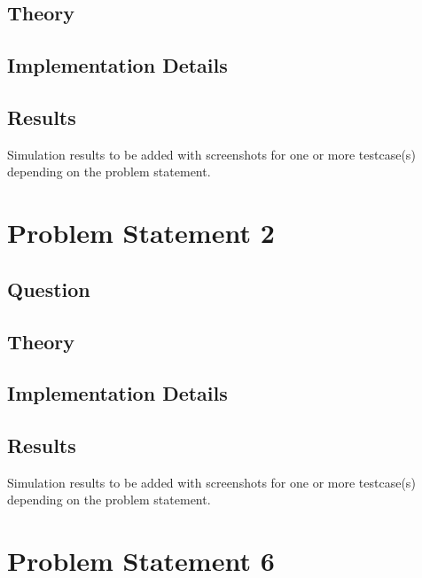 \documentclass[11pt,a4paper]{article}
\begin{document}
\subsection{Theory}\label{sec:theory1}

\subsection{Implementation Details}\label{sec:details1}

\subsection{Results}\label{sec:results1}
Simulation results to be added with screenshots for one or more testcase(s) depending on the problem statement.


\section{Problem Statement 2}\label{sec:problem2}
\subsection{Question}\label{sec:question2}

\subsection{Theory}\label{sec:theory2}

\subsection{Implementation Details}\label{sec:details2}

\subsection{Results}\label{sec:results2}
Simulation results to be added with screenshots for one or more testcase(s) depending on the problem statement.

\section{Problem Statement 6}\label{sec:problem6}
\end{document}
